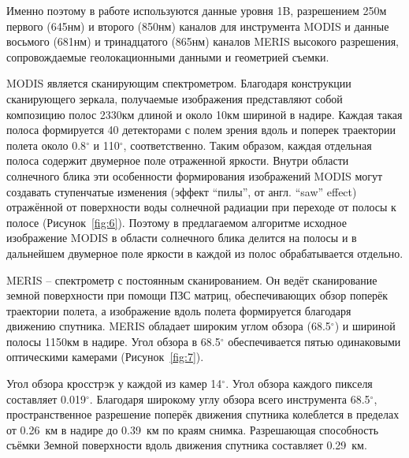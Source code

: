 Именно поэтому в работе используются данные уровня 1B, разрешением 250м первого (645нм) и второго (850нм) каналов для инструмента MODIS и данные восьмого (681нм) и тринадцатого (865нм) каналов MERIS высокого разрешения, сопровождаемые геолокационными данными и геометрией съемки.

MODIS является сканирующим спектрометром. Благодаря конструкции сканирующего зеркала, получаемые изображения представляют собой композицию полос 2330км длиной и около 10км шириной в надире. Каждая такая полоса формируется 40 детекторами с полем зрения вдоль и поперек траектории полета около 0.8${}^\circ$ и 110${}^\circ$, соответственно. Таким образом, каждая отдельная полоса содержит двумерное поле отраженной яркости. Внутри области солнечного блика эти особенности формирования изображений MODIS могут создавать ступенчатые изменения (эффект ``пилы'', от англ. ``saw'' effect) отражённой от поверхности воды солнечной радиации при переходе от полосы к полосе (Рисунок~\ref{fig:6}). Поэтому в предлагаемом алгоритме исходное изображение MODIS в области солнечного блика делится на полосы и в дальнейшем двумерное поле яркости в каждой из полос обрабатывается отдельно.

MERIS -- спектрометр с постоянным сканированием. Он ведёт сканирование земной поверхности при помощи ПЗС матриц, обеспечивающих обзор поперёк траектории полета, а изображение вдоль полета формируется благодаря движению спутника. MERIS обладает широким углом обзора (68.5${}^\circ$) и шириной полосы 1150км в надире. Угол обзора в 68.5${}^\circ$ обеспечивается пятью одинаковыми оптическими камерами (Рисунок~\ref{fig:7}).

Угол обзора кросстрэк у каждой из камер 14${}^\circ$. Угол обзора каждого пикселя составляет 0.019${}^\circ$. Благодаря широкому углу обзора всего инструмента 68.5${}^\circ$, пространственное разрешение поперёк движения спутника колеблется в пределах от 0.26~км в надире до 0.39~км по краям снимка. Разрешающая способность съёмки Земной поверхности вдоль движения спутника составляет 0.29~км.


